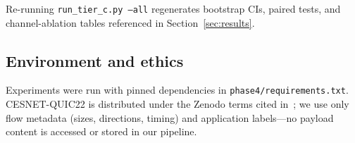 Re-running \texttt{run\_tier\_c.py --all} regenerates bootstrap CIs, paired tests, and
channel-ablation tables referenced in Section~\ref{sec:results}.

\subsection{Environment and ethics}

Experiments were run with pinned dependencies in \texttt{phase4/requirements.txt}.
CESNET-QUIC22 is distributed under the Zenodo terms cited in~\cite{cesnet_quic22};
we use only flow metadata (sizes, directions, timing) and application labels---no
payload content is accessed or stored in our pipeline.
